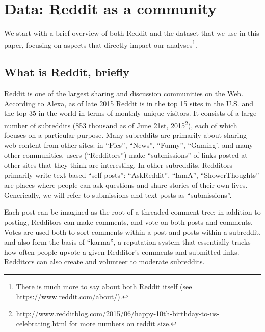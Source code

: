 \section{Data: Reddit as a community}

We start with a brief overview of both Reddit and the dataset that we use in this paper, focusing on aspects that directly impact our analyses\footnote{There is much more to say about both Reddit itself (see \url{https://www.reddit.com/about/}).}.

\subsection{What is Reddit, briefly}

Reddit is one of the largest sharing and discussion communities on the Web.  According to Alexa, as of late 2015 Reddit is in the top 15 sites in the U.S. and the top 35 in the world in terms of monthly unique visitors.  It consists of a large number of subreddits (853 thousand as of June 21st, 2015\footnote{\url{http://www.redditblog.com/2015/06/happy-10th-birthday-to-us-celebrating.html} for more numbers on reddit size.}), each of which focuses on a particular purpose.  Many subreddits are primarily about sharing web content from other sites: in ``Pics'', ``News'', ``Funny'', ``Gaming', and many other communities, users (``Redditors'') make ``submissions'' of links posted at other sites that they think are interesting.  In other subreddits, Redditors primarily write text-based ``self-posts'': ``AskReddit'', ``IamA'', ``ShowerThoughts'' are places where people can ask questions and share stories of their own lives.  Generically, we will refer to submissions and text posts as ``submissions''.  



Each post can be imagined as the root of a threaded comment tree; in addition to posting, Redditors can make comments, and vote on both posts and comments.  Votes are used both to sort comments within a post and posts within a subreddit, and also form the basis of ``karma'', a reputation system that essentially tracks how often people upvote a given Redditor's comments and submitted links.  Redditors can also create and volunteer to moderate subreddits.

